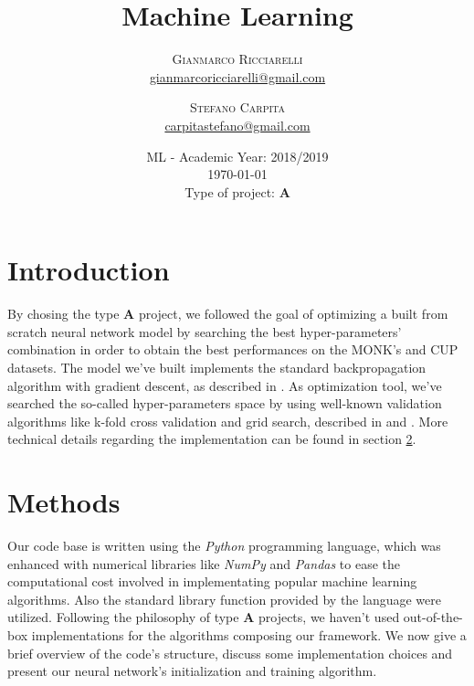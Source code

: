 \documentclass[11pt,twoside]{article}
\title{Machine Learning} %
\author{%
\textsc{Gianmarco Ricciarelli} \\[1ex] %
\normalsize \href{mailto:john@smith.com}{gianmarcoricciarelli@gmail.com} %
\and %
\textsc{Stefano Carpita} \\[1ex] %
\normalsize \href{mailto:jane@smith.com}{carpitastefano@gmail.com} %
}
\date{
    ML - Academic Year: 2018/2019 \\
    \today \\
    Type of project: \textbf{A}
}
\begin{document}
\maketitle


\section{Introduction} %
\label{sec:introduction}
    By chosing the type \textbf{A} project, we followed the goal of optimizing a built from scratch neural
    network model by searching the best hyper-parameters' combination in order to obtain the best
    performances on the MONK's and CUP datasets. The model we've built implements the
    standard backpropagation algorithm with gradient descent, as described in \cite{deep_learning}. As
    optimization tool, we've searched the so-called hyper-parameters space by using well-known validation
    algorithms like k-fold cross validation and grid search, described in \cite{deep_learning} and
    \cite{random_search}. More technical details regarding the implementation can be found in section
    \ref{sec:methods}.


\section{Methods} %
\label{sec:methods}
    Our code base is written using the \textit{Python} programming language, which was enhanced with
    numerical libraries like \textit{NumPy} and \textit{Pandas} to ease the computational cost involved in
    implementating popular machine learning algorithms. Also the standard library function provided by the
    language were utilized. Following the philosophy of type \textbf{A} projects, we haven't used
    out-of-the-box implementations for the algorithms composing our framework. We now give a brief overview of
    the code's structure, discuss some implementation choices and present our neural network's initialization and
    training algorithm.
\end{document}
